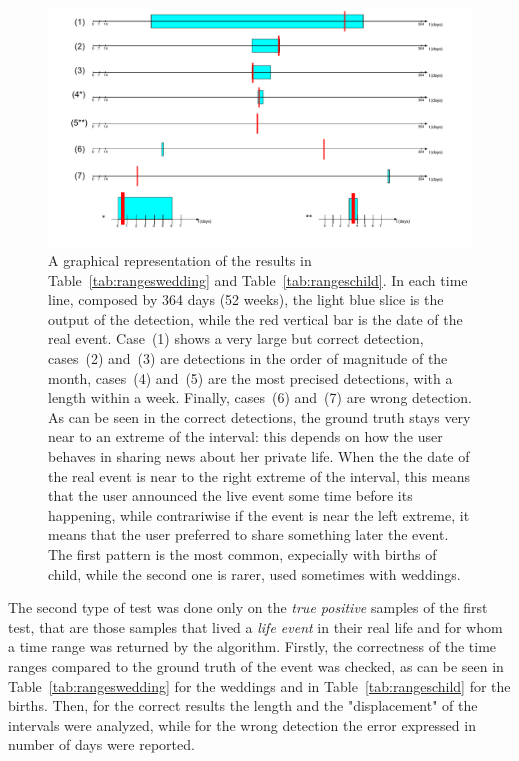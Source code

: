 \begin{figure}
\centering
\includegraphics[width=%
1\textwidth]{img/Timeranges}
\caption{A graphical representation of the results in Table~\ref{tab:rangeswedding} and Table~\ref{tab:rangeschild}. In each time line, composed by 364 days (52 weeks), the light blue slice is the output of the detection, while the red vertical bar is the date of the real event. Case~(1) shows a very large but correct detection, cases~(2) and~(3) are detections in the order of magnitude of the month, cases~(4) and~(5) are the most precised detections, with a length within a week. Finally, cases~(6) and~(7) are wrong detection. As can be seen in the correct detections, the ground truth stays very near to an extreme of the interval: this depends on how the user behaves in sharing news about her private life. When the the date of the real event is near to the right extreme of the interval, this means that the user announced the live event some time before its happening, while contrariwise if the event is near the left extreme, it means that the user preferred to share something later the event. The first pattern is the most common, expecially with births of child, while the second one is rarer, used sometimes with weddings.}
\label{fig:timeranges}
\end{figure}

The second type of test was done only on the \emph{true positive} samples of the first test, that are those samples that lived a \emph{life event} in their real life and for whom a time range was returned by the algorithm. Firstly, the correctness of the time ranges compared to the ground truth of the event was checked, as can be seen in Table~\ref{tab:rangeswedding} for the weddings and in Table~\ref{tab:rangeschild} for the births. Then, for the correct results the length and the "displacement" of the intervals were analyzed, while for the wrong detection the error expressed in number of days were reported.

